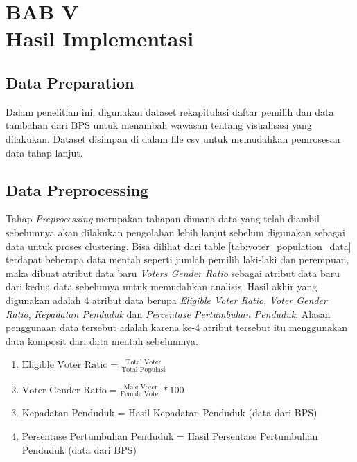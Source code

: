 \section*{\centering BAB V \\ Hasil Implementasi }


\setcounter{section}{5}
\setcounter{subsection}{0}  %
\setcounter{figure}{0}
\setcounter{table}{0}
\setcounter{lstlisting}{0}
\renewcommand{\thetable}{\thesection.\arabic{table}}
\renewcommand{\thefigure}{\thesection.\arabic{figure}}
\renewcommand{\thelstlisting}{\thesection.\arabic{lstlisting}}

\subsection{Data Preparation}
Dalam penelitian ini, digunakan dataset rekapitulasi daftar pemilih dan data tambahan dari BPS untuk menambah wawasan tentang visualisasi yang dilakukan. Dataset disimpan di dalam file csv untuk memudahkan pemrosesan data tahap lanjut.


\subsection{Data Preprocessing}
Tahap \textit{Preprocessing} merupakan tahapan dimana data yang telah diambil sebelumnya akan dilakukan pengolahan lebih lanjut sebelum digunakan sebagai data untuk proses clustering. Bisa dilihat dari table \ref{tab:voter_population_data} terdapat beberapa data mentah seperti jumlah pemilih laki-laki dan perempuan, maka dibuat atribut data baru \textit{Voters Gender Ratio} sebagai atribut data baru dari kedua data sebelumya untuk memudahkan analisis. Hasil akhir yang digunakan adalah 4 atribut data berupa \textit{Eligible Voter Ratio}, \textit{Voter Gender Ratio}, \textit{Kepadatan Penduduk} dan \textit{Percentase Pertumbuhan Penduduk}. Alasan penggunaan data tersebut adalah karena ke-4 atribut tersebut itu menggunakan data komposit dari data mentah sebelumnya.
\begin{enumerate}
    \item $ \text{Eligible Voter Ratio} = \frac{\text{Total Voter}}{\text{Total Populasi}}$
    \item $\text{Voter Gender Ratio} =\frac{\text{Male Voter}}{\text{Female Voter}} * 100 $
    \item Kepadatan Penduduk = Hasil Kepadatan Penduduk (data dari BPS)
    \item Persentase Pertumbuhan Penduduk = Hasil Persentase Pertumbuhan Penduduk (data dari BPS)
\end{enumerate}

